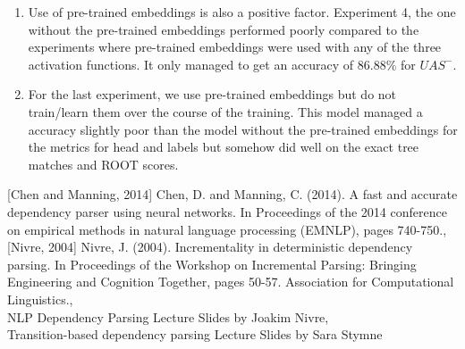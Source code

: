 \documentclass[11pt]{article}
\begin{document}
\begin{enumerate}
	\item Use of pre-trained embeddings is also a positive factor. Experiment 4, the one without the pre-trained embeddings performed poorly compared to the experiments where pre-trained embeddings were used with any of the three activation functions. It only managed to get an accuracy of 86.88\% for $UAS^-$. 
	
	\item For the last experiment, we use pre-trained embeddings but do not train/learn them over the course of the training. This model managed a accuracy slightly poor than the model without the pre-trained embeddings for the metrics for head and labels but somehow did well on the exact tree matches and ROOT scores.
		
\end{enumerate}


\begin{thebibliography}{9}
	[Chen and Manning, 2014] Chen, D. and Manning, C. (2014). A fast and accurate dependency parser using neural networks. In Proceedings of the 2014	conference on empirical methods in natural language processing (EMNLP), pages 740-750.,
	\\\texttt{}
	[Nivre, 2004] Nivre, J. (2004). Incrementality in deterministic dependency parsing. In Proceedings of the Workshop on Incremental Parsing: Bringing Engineering and Cognition Together, pages 50-57. Association for Computational Linguistics.,
	\\\texttt{}
	NLP Dependency Parsing Lecture Slides by Joakim Nivre,
	\\\texttt{}
	Transition-based dependency parsing Lecture Slides by Sara Stymne
	\\\texttt{}
\end{thebibliography}
	
\end{document}
